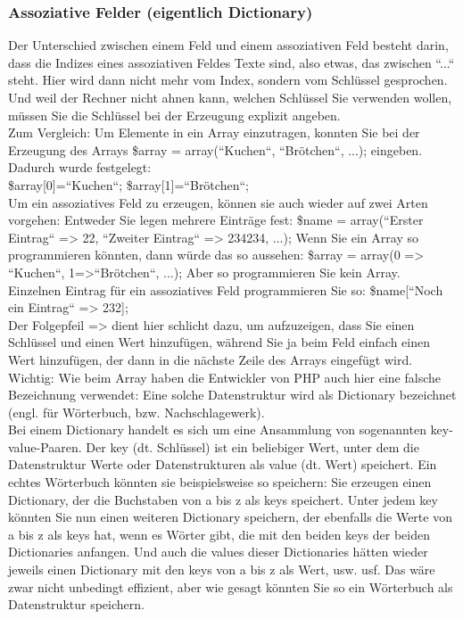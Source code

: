 \subsubsection{Assoziative Felder (eigentlich Dictionary)}
Der Unterschied zwischen einem Feld und einem assoziativen Feld besteht darin, dass die Indizes eines assoziativen Feldes Texte sind, also etwas, das zwischen ``...`` steht. Hier wird dann nicht mehr vom Index, sondern vom Schlüssel gesprochen. Und weil der Rechner nicht ahnen kann, welchen Schlüssel Sie verwenden wollen, müssen Sie die Schlüssel bei der Erzeugung explizit angeben.\\

Zum Vergleich: Um Elemente in ein Array einzutragen, konnten Sie bei der Erzeugung des Arrays \$array = array(``Kuchen``, ``Brötchen``, ...); eingeben. Dadurch wurde festgelegt: \\

\$array[0]=``Kuchen``; \$array[1]=``Brötchen``;\\

Um ein assoziatives Feld zu erzeugen, können sie auch wieder auf zwei Arten vorgehen: Entweder Sie legen mehrere Einträge fest: \$name = array(``Erster Eintrag`` => 22, ``Zweiter Eintrag`` => 234234, ...); Wenn Sie ein Array so programmieren könnten, dann würde das so aussehen: \$array = array(0 => ``Kuchen``, 1=>``Brötchen``, ...); Aber so programmieren Sie kein Array.\\

Einzelnen Eintrag für ein assoziatives Feld programmieren Sie so: \$name[``Noch ein Eintrag`` => 232];\\

Der Folgepfeil => dient hier schlicht dazu, um aufzuzeigen, dass Sie einen Schlüssel und einen Wert hinzufügen, während Sie ja beim Feld einfach einen Wert hinzufügen, der dann in die nächste Zeile des Arrays eingefügt wird.\\

Wichtig: Wie beim \glqq{}Array\grqq{} haben die Entwickler von PHP auch hier eine falsche Bezeichnung verwendet: Eine solche Datenstruktur wird als Dictionary bezeichnet (engl. für Wörterbuch, bzw. Nachschlagewerk). \\

Bei einem Dictionary handelt es sich um eine Ansammlung von sogenannten key-value-Paaren. Der key (dt. Schlüssel) ist ein beliebiger Wert, unter dem die Datenstruktur Werte oder Datenstrukturen als value (dt. Wert) speichert. Ein echtes Wörterbuch könnten sie beispielsweise so speichern: Sie erzeugen einen Dictionary, der die Buchstaben von a bis z als keys speichert. Unter jedem key könnten Sie nun einen weiteren Dictionary speichern, der ebenfalls die Werte von a bis z als keys hat, wenn es Wörter gibt, die mit den beiden keys der beiden Dictionaries anfangen. Und auch die values dieser Dictionaries hätten wieder jeweils einen Dictionary mit den keys von a bis z als Wert, usw. usf. Das wäre zwar nicht unbedingt effizient, aber wie gesagt könnten Sie so ein Wörterbuch als Datenstruktur speichern.\\

